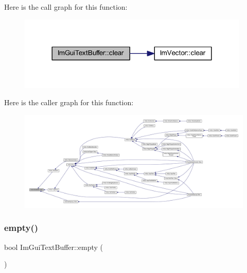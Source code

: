 Here is the call graph for this function\+:
\nopagebreak
\begin{figure}[H]
\begin{center}
\leavevmode
\includegraphics[width=312pt]{struct_im_gui_text_buffer_a9e4edc9f950bc9e35d5c3b3071dbc0df_cgraph}
\end{center}
\end{figure}
Here is the caller graph for this function\+:
\nopagebreak
\begin{figure}[H]
\begin{center}
\leavevmode
\includegraphics[width=350pt]{struct_im_gui_text_buffer_a9e4edc9f950bc9e35d5c3b3071dbc0df_icgraph}
\end{center}
\end{figure}
\mbox{\label{struct_im_gui_text_buffer_afdef38ae725bb5495f0143170fa902c8}} 
\subsubsection{\texorpdfstring{empty()}{empty()}}
{\footnotesize\ttfamily bool Im\+Gui\+Text\+Buffer\+::empty (\begin{DoxyParamCaption}{ }\end{DoxyParamCaption})\hspace{0.3cm}{\ttfamily [inline]}}

\mbox{\label{struct_im_gui_text_buffer_a2fc30ad0d384f98dfcea722f798d91f2}} 
